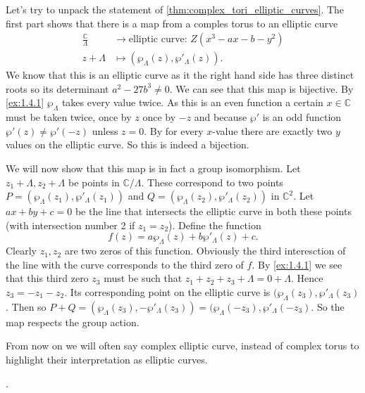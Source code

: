 \documentclass[a4paper]{article}
\theoremstyle{theoremdd}
\theoremstyle{definitiondd}
\theoremstyle{remarkdd}
\newcommand{\C}{\mathbb{C}}
\begin{document}
Let's try to unpack the statement of \cref{thm:complex_tori_elliptic_curves}.
The first part shows that there is a map from a comples torus to an elliptic curve 
\begin{align*}
	\frac{\C}{\Lambda} &\longrightarrow \text{elliptic curve: } Z(x^3 - a x - b -y ^2) \\
	z+\Lambda &\longmapsto \left(\wp_\Lambda(z), \wp'_\Lambda(z)\right)
.\end{align*}
We know that this is an elliptic curve as it the right hand side has three distinct roots so its determinant $a^2 - 27 b^3 \ne 0  $.
We can see that this map is bijective. By \cref{ex:1.4.1}  $\wp_\Lambda$  takes every value twice. As this is an even function a certain $x \in \C$ must be taken twice, once by $z$ once by $-z$ and because $\wp'$ is an odd function $\wp'(z) \ne \wp'(-z)$ unless $z = 0$.  By for every $x$-value there are exactly two $y$ values on the elliptic curve. So this is indeed a bijection. 

We will now show that this map is in fact a group isomorphism.
Let $z_1 + \Lambda, z_2 + \Lambda$ be points in $\C / \Lambda$.
These correspond to two points $P = (\wp_{\Lambda}(z_1), \wp'_\Lambda(z_1))$ and $ Q = (\wp_{\Lambda}(z_2), \wp'_\Lambda(z_2))$ in $\C^2$. 
Let $ax + by + c = 0$ be the line that intersects the elliptic curve in both these points (with intersection number 2 if  $z_1 = z_2$).
Define the function \[
	f(z) = a \wp_{\Lambda}(z) + b \wp'_\Lambda(z) + c
.\] 
Clearly $z_1, z_2$ are two zeros of this function. Obviously the third interesction of the line with the curve corresponds to the third zero of $f$. 
By \cref{ex:1.4.1} we see that this third zero $z_3$ must be such that $z_1 + z_2 + z_3 + \Lambda = 0 + \Lambda$. 
Hence $z_3 = - z_1 - z_2$. Its corresponding point on the elliptic curve is 
$(\wp_\Lambda(z_3), \wp'_\Lambda(z_3)$. Then so $P + Q = (\wp_\Lambda(z_3), - \wp'_\Lambda(z_3)) = (\wp_\Lambda(-z_3), \wp'_\Lambda(-z_3)$. 
So the map respects the group action. 


From now on we will often say complex elliptic curve, instead of complex torus to highlight their interpretation as elliptic curves.

.
\end{document}
